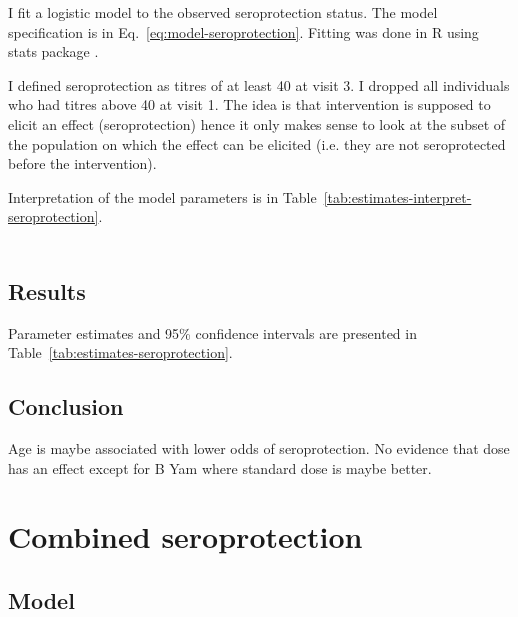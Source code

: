 \documentclass[11pt]{article}
\begin{document}
I fit a logistic model to the observed seroprotection status.
The model specification is in Eq.~\ref{eq:model-seroprotection}.
Fitting was done in R using stats package \cite{R}.

I defined seroprotection as titres of at least 40 at visit 3.
I dropped all individuals who had titres above 40 at visit 1.
The idea is that intervention is supposed to elicit an effect (seroprotection)
hence it only makes sense to look at the subset of the population on which
the effect can be elicited
(i.e. they are not seroprotected before the intervention).

Interpretation of the model parameters is in
Table~\ref{tab:estimates-interpret-seroprotection}.

\begin{equation}
  \begin{gathered}
    \label{eq:model-seroprotection}
    
  \end{gathered}
\end{equation}





\subsection{Results}

Parameter estimates and 95\% confidence intervals
are presented in Table~\ref{tab:estimates-seroprotection}.



\subsection{Conclusion}

Age is maybe associated with lower odds of seroprotection. No evidence that
dose has an effect except for B Yam where standard dose is maybe better.

\section{Combined seroprotection}

\subsection{Model}
\end{document}
